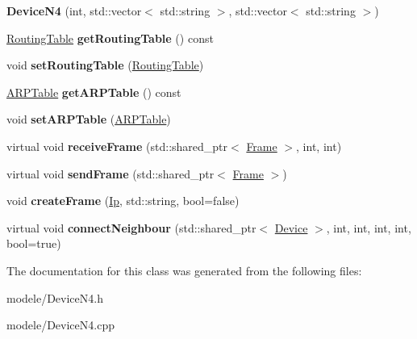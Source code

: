 \begin{DoxyCompactItemize}
\item 
\hypertarget{class_device_n4_a8442e50073a0a043e4cf2396fc61ca18}{{\bfseries Device\-N4} (int, std\-::vector$<$ std\-::string $>$, std\-::vector$<$ std\-::string $>$)}\label{class_device_n4_a8442e50073a0a043e4cf2396fc61ca18}

\item 
\hypertarget{class_device_n4_ace9e24807a683285d61eb885591d9f49}{\hyperlink{class_routing_table}{Routing\-Table} {\bfseries get\-Routing\-Table} () const }\label{class_device_n4_ace9e24807a683285d61eb885591d9f49}

\item 
\hypertarget{class_device_n4_ac83e3ae35303b6dab8f963a335c97f4f}{void {\bfseries set\-Routing\-Table} (\hyperlink{class_routing_table}{Routing\-Table})}\label{class_device_n4_ac83e3ae35303b6dab8f963a335c97f4f}

\item 
\hypertarget{class_device_n4_a77f322d0dcfcabf8cb6262f25ed5dcfd}{\hyperlink{class_a_r_p_table}{A\-R\-P\-Table} {\bfseries get\-A\-R\-P\-Table} () const }\label{class_device_n4_a77f322d0dcfcabf8cb6262f25ed5dcfd}

\item 
\hypertarget{class_device_n4_a807ddbf739363a992b7ddbf470ebe409}{void {\bfseries set\-A\-R\-P\-Table} (\hyperlink{class_a_r_p_table}{A\-R\-P\-Table})}\label{class_device_n4_a807ddbf739363a992b7ddbf470ebe409}

\item 
\hypertarget{class_device_n4_a3e9bc1ad1779c3f0c03956afa4ae9f5d}{virtual void {\bfseries receive\-Frame} (std\-::shared\-\_\-ptr$<$ \hyperlink{class_frame}{Frame} $>$, int, int)}\label{class_device_n4_a3e9bc1ad1779c3f0c03956afa4ae9f5d}

\item 
\hypertarget{class_device_n4_a72cafe09bd6e658fbd068a9166455349}{virtual void {\bfseries send\-Frame} (std\-::shared\-\_\-ptr$<$ \hyperlink{class_frame}{Frame} $>$)}\label{class_device_n4_a72cafe09bd6e658fbd068a9166455349}

\item 
\hypertarget{class_device_n4_a51b7dbeb9cd519ba64d0938007b59049}{void {\bfseries create\-Frame} (\hyperlink{class_ip}{Ip}, std\-::string, bool=false)}\label{class_device_n4_a51b7dbeb9cd519ba64d0938007b59049}

\item 
\hypertarget{class_device_n4_a123e90e4efddd74e68e04f446bb6351f}{virtual void {\bfseries connect\-Neighbour} (std\-::shared\-\_\-ptr$<$ \hyperlink{class_device}{Device} $>$, int, int, int, int, bool=true)}\label{class_device_n4_a123e90e4efddd74e68e04f446bb6351f}

\end{DoxyCompactItemize}


The documentation for this class was generated from the following files\-:\begin{DoxyCompactItemize}
\item 
modele/Device\-N4.\-h\item 
modele/Device\-N4.\-cpp\end{DoxyCompactItemize}
